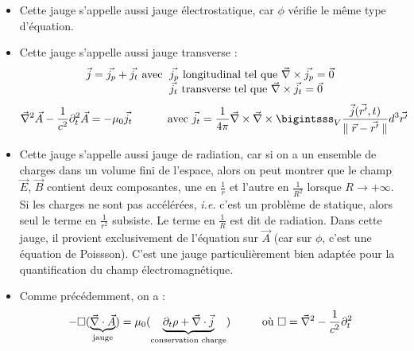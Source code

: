 	
	\begin{remarks}\hspace{1pt}
		\begin{itemize}
			\item Cette jauge s'appelle aussi jauge électrostatique, car $\phi$ vérifie le même type d'équation.
			\item Cette jauge s'appelle aussi jauge transverse :
$$
	\begin{array}{r@{\;}l}
					\vec{j}=\vec{j_p}+\vec{j_t} \text{ avec }&\vec{j_p} \text{ longitudinal tel que } \nab\times\vec{j_p}=\vec{0}\\
					&\vec{j_t} \text{ transverse tel que } \nab\times\vec{j_t}=\vec{0}
	\end{array}
$$
$$
			\nab^2\vec{A}-\frac{1}{c^2}\partial_t^2\vec{A}=-\mu_0\vec{j_t}\\
			\text{\hspace{1cm} avec }\vec{j_t}=\frac{1}{4\pi}\nab\times\nab\times\bigintsss_V\frac{\vec{j}(\vec{r'},t)}{\parallel\vec{r}-\vec{r'}\parallel}d^3\vec{r'}
$$
			\item {\txt Cette jauge s'appelle aussi jauge de radiation, car si on a un ensemble de charges dans un volume fini de l'espace, alors on peut montrer que le champ $\vec{E}$, $\vec{B}$ contient deux composantes, une en $\frac{1}{r}$ et l'autre en $\frac{1}{R^2}$ lorsque $R\rightarrow+\infty$. Si les charges ne sont pas accélérées, \emph{i.e.} c'est un problème de statique, alors seul le terme en $\frac{1}{r^2}$ subsiste. Le terme en $\frac{1}{R}$ est dit de radiation. Dans cette jauge, il provient exclusivement de l'équation sur $\vec{A}$ (car sur $\phi$, c'est une équation de Poissson). C'est une jauge particulièrement bien adaptée pour la quantification du champ électromagnétique.}
			\item Comme précédemment, on a :
$$
	-\square(\underbrace{\vec{\nabla}\cdot\vec{A}}_{\text{jauge}})=\mu_0(\underbrace{\partial_t\rho+\vec{\nabla}\cdot\vec{j}}_{\text{conservation  charge}})\text{\hspace{1cm}où }\square=\vec{\nabla}^2-\frac{1}{c^2}\partial_t^2
$$
		\end{itemize}
	\end{remarks}